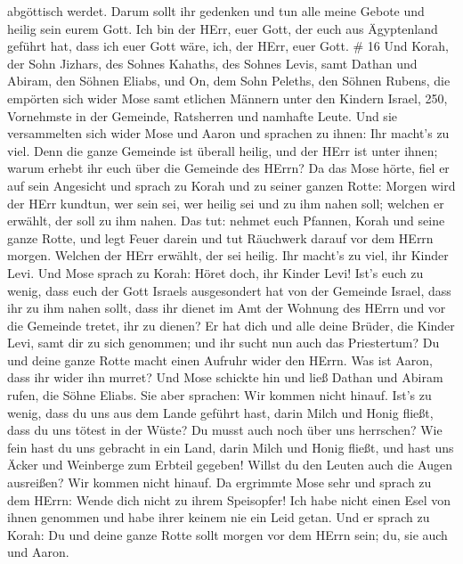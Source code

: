 abgöttisch werdet.  Darum sollt ihr gedenken und tun alle
meine Gebote und heilig sein eurem Gott.  Ich bin der HErr,
euer Gott, der euch aus Ägyptenland geführt hat, dass ich euer Gott
wäre, ich, der HErr, euer Gott. \# 16  Und Korah, der Sohn
Jizhars, des Sohnes Kahaths, des Sohnes Levis, samt Dathan und Abiram,
den Söhnen Eliabs, und On, dem Sohn Peleths, den Söhnen Rubens,
 die empörten sich wider Mose samt etlichen Männern unter
den Kindern Israel, 250, Vornehmste in der Gemeinde, Ratsherren und
namhafte Leute.  Und sie versammelten sich wider Mose und
Aaron und sprachen zu ihnen: Ihr macht's zu viel. Denn die ganze
Gemeinde ist überall heilig, und der HErr ist unter ihnen; warum erhebt
ihr euch über die Gemeinde des HErrn?  Da das Mose hörte,
fiel er auf sein Angesicht  und sprach zu Korah und zu
seiner ganzen Rotte: Morgen wird der HErr kundtun, wer sein sei, wer
heilig sei und zu ihm nahen soll; welchen er erwählt, der soll zu ihm
nahen.  Das tut: nehmet euch Pfannen, Korah und seine ganze
Rotte,  und legt Feuer darein und tut Räuchwerk darauf vor
dem HErrn morgen. Welchen der HErr erwählt, der sei heilig. Ihr macht's
zu viel, ihr Kinder Levi.  Und Mose sprach zu Korah: Höret
doch, ihr Kinder Levi!  Ist's euch zu wenig, dass euch der
Gott Israels ausgesondert hat von der Gemeinde Israel, dass ihr zu ihm
nahen sollt, dass ihr dienet im Amt der Wohnung des HErrn und vor die
Gemeinde tretet, ihr zu dienen?  Er hat dich und alle deine
Brüder, die Kinder Levi, samt dir zu sich genommen; und ihr sucht nun
auch das Priestertum?  Du und deine ganze Rotte macht einen
Aufruhr wider den HErrn. Was ist Aaron, dass ihr wider ihn murret?
 Und Mose schickte hin und ließ Dathan und Abiram rufen,
die Söhne Eliabs. Sie aber sprachen: Wir kommen nicht hinauf.
 Ist's zu wenig, dass du uns aus dem Lande geführt hast,
darin Milch und Honig fließt, dass du uns tötest in der Wüste? Du musst
auch noch über uns herrschen?  Wie fein hast du uns
gebracht in ein Land, darin Milch und Honig fließt, und hast uns Äcker
und Weinberge zum Erbteil gegeben! Willst du den Leuten auch die Augen
ausreißen? Wir kommen nicht hinauf.  Da ergrimmte Mose sehr
und sprach zu dem HErrn: Wende dich nicht zu ihrem Speisopfer! Ich habe
nicht einen Esel von ihnen genommen und habe ihrer keinem nie ein Leid
getan.  Und er sprach zu Korah: Du und deine ganze Rotte
sollt morgen vor dem HErrn sein; du, sie auch und Aaron. 
